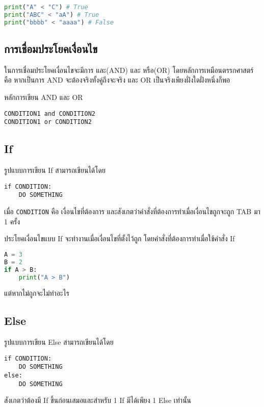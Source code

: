 \begin{lstlisting}[language=Python]
print("A" < "C") # True
print("ABC" < "aA") # True
print("bbbb" < "aaaa") # False
\end{lstlisting}

\subsection{การเชื่อมประโยคเงื่อนไข}

ในการเชื่อมประโยคเงื่อนไขจะมีการ และ(AND) และ หรือ(OR) โดยหลักการเหมือนตรรกศาสตร์ คือ หากเป็นการ AND จะต้องจริงทั้งคู่ถึงจะจริง และ OR เป็นจริงเพียงฝั่งใดฝั่งหนึ่งก็พอ

หลักการเขียน AND และ OR

\begin{verbatim}
CONDITION1 and CONDITION2
CONDITION1 or CONDITION2
\end{verbatim}

\subsection{If}

รูปแบบการเขียน If สามารถเขียนได้โดย

\begin{verbatim}
if CONDITION:
    DO SOMETHING
\end{verbatim}

เมื่อ \verb|CONDITION| คือ เงื่อนไขที่ต้องการ และสังเกตว่าคำสั่งที่ต้องการทำเมื่อเงื่อนไขถูกจะถูก TAB มา 1 ครั้ง

ประโยคเงื่อนไขแบบ If จะทำงานเมื่อเงื่อนไขที่ตั้งไว้ถูก โดยคำสั่งที่ต้องการทำเมื่อใช้คำสั่ง If 

\begin{lstlisting}[language=Python]
A = 3
B = 2
if A > B:
    print("A > B")
\end{lstlisting}

แต่หากไม่ถูกจะไม่ทำอะไร

\subsection{Else}

รูปแบบการเขียน Else สามารถเขียนได้โดย 

\begin{verbatim}
if CONDITION:
    DO SOMETHING
else:
    DO SOMETHING
\end{verbatim}

สังเกตว่าต้องมี If ขึ้นก่อนเสมอและสำหรับ 1 If มีได้เพียง 1 Else เท่านั้น

